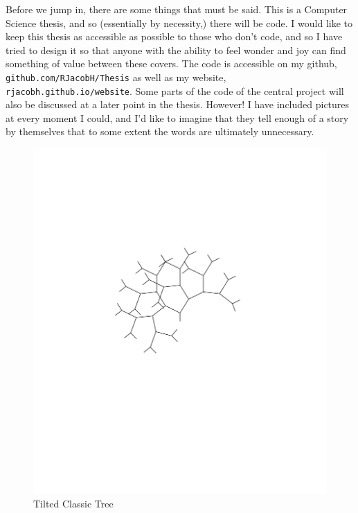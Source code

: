 \documentclass[12pt,twoside]{reedthesis}
\begin{document}
Before we jump in, there are some things that must be said. This is a Computer Science thesis, and so (essentially by necessity,) there will be code. I would like to keep this thesis as accessible as possible to those who don’t code, and so I have tried to design it so that anyone with the ability to feel wonder and joy can find something of value between these covers. The code is accessible on my github, {\tt github.com/RJacobH/Thesis} as well as my website, {\tt rjacobh.github.io/website}. Some parts of the code of the central project will also be discussed at a later point in the thesis. However! I have included pictures at every moment I could, and I’d like to imagine that they tell enough of a story by themselves that to some extent the words are ultimately unnecessary.

	\begin{figure}[h]
	\centering
	\includegraphics[clip=true, viewport=2.5in 4.5in 7.5in 8.5in, scale=0.75]{Images/Introduction2} 
	\caption[Tilted Classic Tree]{Tilted Classic Tree\footnotemark}
	\label {Introduction2}
	\end{figure}
\end{document}
